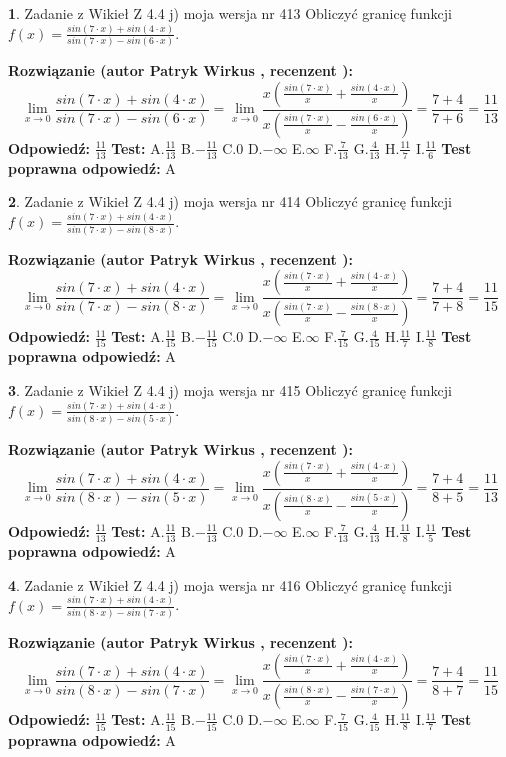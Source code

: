 \documentclass[12pt, a4paper]{article}
\theoremstyle{definition} %
\newtheorem{zad}{}
\newcommand{\zadStart}[1]{\begin{zad}#1\newline}
\newcommand{\zadStop}{\end{zad}}
\newcommand{\rozwStart}[2]{\noindent \textbf{Rozwiązanie (autor #1 , recenzent #2): }\newline}
\newcommand{\rozwStop}{\newline}
\newcommand{\odpStart}{\noindent \textbf{Odpowiedź:}\newline}
\newcommand{\odpStop}{\newline}
\newcommand{\testStart}{\noindent \textbf{Test:}\newline}
\newcommand{\testStop}{\newline}
\newcommand{\kluczStart}{\noindent \textbf{Test poprawna odpowiedź:}\newline}
\newcommand{\kluczStop}{\newline}
\begin{document}
\zadStart{Zadanie z Wikieł Z 4.4 j) moja wersja nr 413}
Obliczyć granicę funkcji $f(x)=\frac{sin(7\cdot x) +sin(4\cdot x)}{sin(7\cdot x) -sin(6\cdot x)}$.
\zadStop
\rozwStart{Patryk Wirkus}{}
$$\lim\limits_{x\to 0}\frac{sin(7\cdot x) +sin(4\cdot x)}{sin(7\cdot x) -sin(6\cdot x)}=\lim\limits_{x\to 0}\frac{x(\frac{sin(7\cdot x)}{x}+\frac{sin(4\cdot x)}{x})}{x(\frac{sin(7\cdot x)}{x}-\frac{sin(6\cdot x)}{x})}=\frac{7+4}{7+6} = \frac{11}{13}$$
\rozwStop
\odpStart
$\frac{11}{13}$
\odpStop
\testStart
A.$\frac{11}{13}$
B.$-\frac{11}{13}$
C.$0$
D.$-\infty$
E.$\infty$
F.$\frac{7}{13}$
G.$\frac{4}{13}$
H.$\frac{11}{7}$
I.$\frac{11}{6}$
\testStop
\kluczStart
A
\kluczStop



\zadStart{Zadanie z Wikieł Z 4.4 j) moja wersja nr 414}
Obliczyć granicę funkcji $f(x)=\frac{sin(7\cdot x) +sin(4\cdot x)}{sin(7\cdot x) -sin(8\cdot x)}$.
\zadStop
\rozwStart{Patryk Wirkus}{}
$$\lim\limits_{x\to 0}\frac{sin(7\cdot x) +sin(4\cdot x)}{sin(7\cdot x) -sin(8\cdot x)}=\lim\limits_{x\to 0}\frac{x(\frac{sin(7\cdot x)}{x}+\frac{sin(4\cdot x)}{x})}{x(\frac{sin(7\cdot x)}{x}-\frac{sin(8\cdot x)}{x})}=\frac{7+4}{7+8} = \frac{11}{15}$$
\rozwStop
\odpStart
$\frac{11}{15}$
\odpStop
\testStart
A.$\frac{11}{15}$
B.$-\frac{11}{15}$
C.$0$
D.$-\infty$
E.$\infty$
F.$\frac{7}{15}$
G.$\frac{4}{15}$
H.$\frac{11}{7}$
I.$\frac{11}{8}$
\testStop
\kluczStart
A
\kluczStop



\zadStart{Zadanie z Wikieł Z 4.4 j) moja wersja nr 415}
Obliczyć granicę funkcji $f(x)=\frac{sin(7\cdot x) +sin(4\cdot x)}{sin(8\cdot x) -sin(5\cdot x)}$.
\zadStop
\rozwStart{Patryk Wirkus}{}
$$\lim\limits_{x\to 0}\frac{sin(7\cdot x) +sin(4\cdot x)}{sin(8\cdot x) -sin(5\cdot x)}=\lim\limits_{x\to 0}\frac{x(\frac{sin(7\cdot x)}{x}+\frac{sin(4\cdot x)}{x})}{x(\frac{sin(8\cdot x)}{x}-\frac{sin(5\cdot x)}{x})}=\frac{7+4}{8+5} = \frac{11}{13}$$
\rozwStop
\odpStart
$\frac{11}{13}$
\odpStop
\testStart
A.$\frac{11}{13}$
B.$-\frac{11}{13}$
C.$0$
D.$-\infty$
E.$\infty$
F.$\frac{7}{13}$
G.$\frac{4}{13}$
H.$\frac{11}{8}$
I.$\frac{11}{5}$
\testStop
\kluczStart
A
\kluczStop



\zadStart{Zadanie z Wikieł Z 4.4 j) moja wersja nr 416}
Obliczyć granicę funkcji $f(x)=\frac{sin(7\cdot x) +sin(4\cdot x)}{sin(8\cdot x) -sin(7\cdot x)}$.
\zadStop
\rozwStart{Patryk Wirkus}{}
$$\lim\limits_{x\to 0}\frac{sin(7\cdot x) +sin(4\cdot x)}{sin(8\cdot x) -sin(7\cdot x)}=\lim\limits_{x\to 0}\frac{x(\frac{sin(7\cdot x)}{x}+\frac{sin(4\cdot x)}{x})}{x(\frac{sin(8\cdot x)}{x}-\frac{sin(7\cdot x)}{x})}=\frac{7+4}{8+7} = \frac{11}{15}$$
\rozwStop
\odpStart
$\frac{11}{15}$
\odpStop
\testStart
A.$\frac{11}{15}$
B.$-\frac{11}{15}$
C.$0$
D.$-\infty$
E.$\infty$
F.$\frac{7}{15}$
G.$\frac{4}{15}$
H.$\frac{11}{8}$
I.$\frac{11}{7}$
\testStop
\kluczStart
A
\kluczStop
\end{document}
